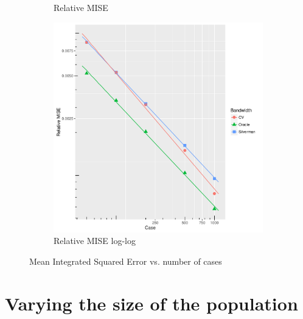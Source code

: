 \begin{figure}[htb]
\begin{subfigure}[b]{0.3\textwidth}
    \caption{Relative MISE}
    \end{subfigure}
    \begin{subfigure}[b]{0.3\textwidth}
    \includegraphics[width=\textwidth]{results/by_num_cases/RMISE-vs-cases-log-log}
    \caption{Relative MISE log-log}
    \end{subfigure}
    \caption[MISE: by number of cases]{Mean Integrated Squared Error vs. number of cases}
    \label{fig:ise:unif_NCases_1h}
\end{figure}


\section{Varying the size of the population}
\label{sec:results:unifNpop_1h}

